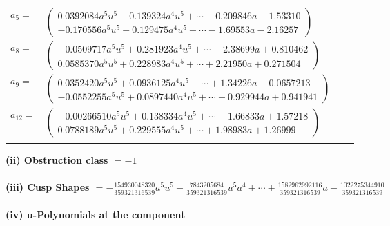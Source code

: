 \documentclass[1p]{elsarticle_modified}
\theoremstyle{definition}
\begin{document}
\begin{tabular}{m{7pt} m{180pt} m{7pt} m{180pt} }
\flushright $a_{5}=$&$\begin{pmatrix}0.0392084 a^{5} u^{5}-0.139324 a^{4} u^{5}+\cdots-0.209846 a-1.53310\\-0.170556 a^{5} u^{5}-0.129475 a^{4} u^{5}+\cdots-1.69553 a-2.16257\end{pmatrix}$ \\
\flushright $a_{8}=$&$\begin{pmatrix}-0.0509717 a^{5} u^{5}+0.281923 a^{4} u^{5}+\cdots+2.38699 a+0.810462\\0.0585370 a^{5} u^{5}+0.228983 a^{4} u^{5}+\cdots+2.21950 a+0.271504\end{pmatrix}$ \\
\flushright $a_{9}=$&$\begin{pmatrix}0.0352420 a^{5} u^{5}+0.0936125 a^{4} u^{5}+\cdots+1.34226 a-0.0657213\\-0.0552255 a^{5} u^{5}+0.0897440 a^{4} u^{5}+\cdots+0.929944 a+0.941941\end{pmatrix}$ \\
\flushright $a_{12}=$&$\begin{pmatrix}-0.00266510 a^{5} u^{5}+0.138334 a^{4} u^{5}+\cdots-1.66833 a+1.57218\\0.0788189 a^{5} u^{5}+0.229555 a^{4} u^{5}+\cdots+1.98983 a+1.26999\end{pmatrix}$\\&\end{tabular}
\flushleft \textbf{(ii) Obstruction class $= -1$}\\~\\
\flushleft \textbf{(iii) Cusp Shapes $= -\frac{154930048320}{359321316539} a^5 u^5-\frac{7843205684}{359321316539} u^5 a^4+\cdots+\frac{1582962992116}{359321316539} a-\frac{1022275344910}{359321316539}$}\\~\\
\newpage\renewcommand{\arraystretch}{1}
\flushleft \textbf{(iv) u-Polynomials at the component}\newline \\
\end{document}
